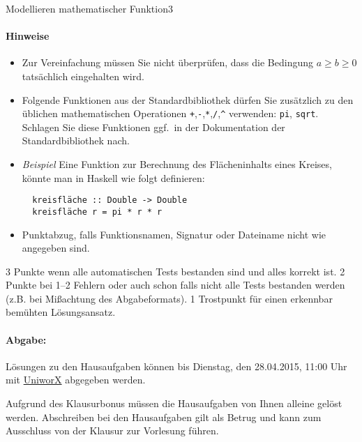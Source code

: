 \documentclass[11pt]{article}
\begin{document}
\begin{hausaufgabe}[hss]{Modellieren mathematischer Funktion}{3}
  \paragraph{Hinweise}
  \begin{itemize}
    \item Zur Vereinfachung müssen Sie nicht überprüfen,
          dass die Bedingung $a \ge b \ge 0$ tatsächlich eingehalten wird.
    \item Folgende Funktionen aus der Standardbibliothek dürfen Sie zusätzlich 
      zu den üblichen mathematischen Operationen \verb|+|,\verb|-|,\verb|*|,\verb|/|,\verb|^|
    verwenden: \verb|pi|, \verb|sqrt|. Schlagen Sie diese Funktionen ggf.\ in der Dokumentation der 
    Standardbibliothek nach.
    \item \emph{Beispiel}          
  Eine Funktion zur Berechnung des Flächeninhalts eines Kreises, könnte man in Haskell 
  wie folgt definieren: \begin{verbatim}  
  kreisfläche :: Double -> Double 
  kreisfläche r = pi * r * r \end{verbatim}   
    
    \item Punktabzug, falls Funktionsnamen, Signatur oder Dateiname nicht wie angegeben sind.
  \end{itemize}

  \begin{loesung}
    
     \begin{bewertung}
      3 Punkte wenn alle automatischen Tests bestanden sind und alles korrekt ist.
      2 Punkte bei 1--2 Fehlern oder auch schon falls nicht alle Tests bestanden werden (z.B. bei Mißachtung des Abgabeformats).
      1 Trostpunkt für einen erkennbar bemühten Lösungsansatz.
    \end{bewertung}
  \end{loesung}

\end{hausaufgabe}



\vspace{\fill}
\paragraph{Abgabe:}
Lösungen zu den Hausaufgaben können bis Dienstag, den 28.04.2015, 11:00 Uhr mit \href{https://uniworx.ifi.lmu.de/?action=uniworxCourseWelcome&id=398}{UniworX} abgegeben werden.

Aufgrund des Klausurbonus müssen die Hausaufgaben von Ihnen alleine gelöst werden.
Abschreiben bei den Hausaufgaben gilt als Betrug und kann zum Ausschluss von der Klausur zur Vorlesung führen.
\end{document}
